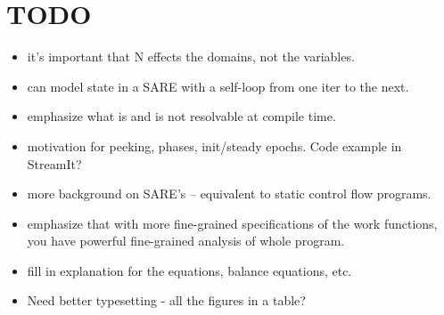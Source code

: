 \section{TODO}

\begin{itemize}

\item it's important that N effects the domains, not the variables.

\item can model state in a SARE with a self-loop from one iter to the next.

\item emphasize what is and is not resolvable at compile time.

\item motivation for peeking, phases, init/steady epochs.  Code
example in StreamIt?

\item more background on SARE's -- equivalent to static control flow
programs.

\item emphasize that with more fine-grained specifications of the work
functions, you have powerful fine-grained analysis of whole program.

\item fill in explanation for the equations, balance equations, etc.

\item Need better typesetting - all the figures in a table?

\end{itemize}

